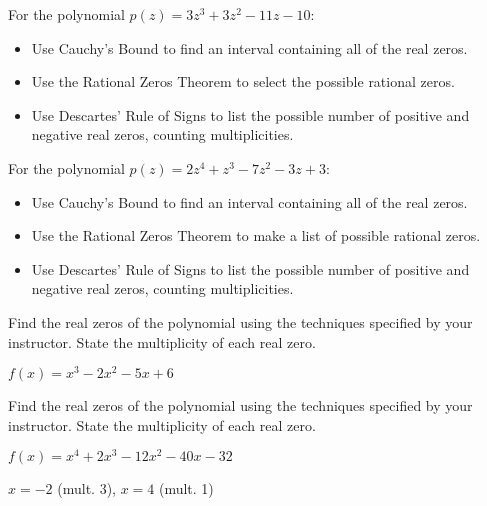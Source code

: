\documentclass{ximera}
\begin{document}
\begin{problem}
For the polynomial $p(z) = 3z^{3} + 3z^{2} - 11z - 10$:

\begin{itemize}
\item  Use Cauchy's Bound to find an interval containing all of the real zeros.
\item  Use the Rational Zeros Theorem to select the possible rational zeros.
\begin{selectAll}
  \end{selectAll}
\item  Use Descartes' Rule of Signs to list the possible number of positive and negative real zeros, counting multiplicities.
\end{itemize}
\end{problem}

\begin{problem}\label{prelimpolystufflast}
For the polynomial $p(z) = 2z^4+z^3-7z^2-3z+3$:

\begin{itemize}
\item  Use Cauchy's Bound to find an interval containing all of the real zeros.
\item  Use the Rational Zeros Theorem to make a list of possible rational zeros.
\item  Use Descartes' Rule of Signs to list the possible number of positive and negative real zeros, counting multiplicities.
\end{itemize}
\end{problem}

\begin{problem}\label{findrealzerosexerfirst}
Find the real zeros of the polynomial using the techniques specified by your instructor.  State the multiplicity of each real zero.

$f(x) = x^{3} - 2x^{2} - 5x + 6$
\end{problem}

\begin{problem}
Find the real zeros of the polynomial using the techniques specified by your instructor.  State the multiplicity of each real zero.

$f(x) = x^{4} + 2x^{3} - 12x^{2} - 40x - 32$

\begin{solution}
$x = -2$ (mult. 3), $x = 4$ (mult. 1)   
\end{solution}
\end{problem}
\end{document}
